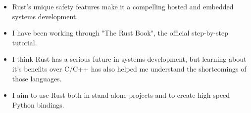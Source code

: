{
  {\begin{itemize}
    \item Rust's unique safety features make it a compelling hosted and embedded systems development.
    \item I have been working through "The Rust Book", the official step-by-step tutorial.
    \item I think Rust has a serious future in systems development, but learning about it's benefits over C/C++ has also helped me understand the shortcomings of those languages.
    \item I aim to use Rust both in stand-alone projects and to create high-speed Python bindings. 
  \end{itemize}
  }
}


